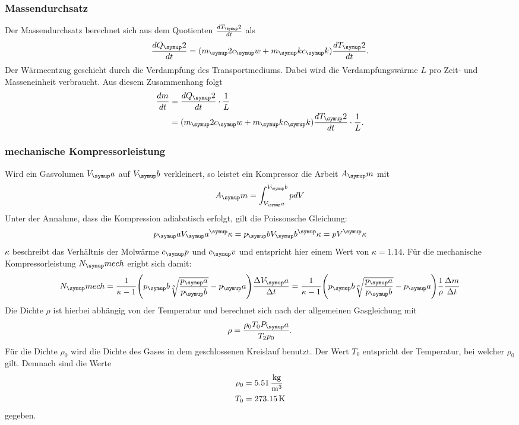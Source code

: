 \subsubsection{Massendurchsatz}
Der Massendurchsatz berechnet sich aus dem Quotienten $\frac{dT_\su{2}}{dt}$ als
\begin{equation}
  \frac{dQ_\su{2}}{dt}= (m_\su{2}c_\su{w}+m_\su{k}c_\su{k})\frac{dT_\su{2}}{dt}.
\end{equation}
Der Wärmeentzug geschieht durch die Verdampfung des Transportmediums. Dabei wird die
Verdampfungswärme $L$ pro Zeit- und Masseneinheit verbraucht. Aus diesem Zusammenhang folgt
\begin{align}
  \frac{dm}{dt} &= \frac{dQ_\su{2}}{dt} \cdot \frac{1}{L} \\
      &= (m_\su{2}c_\su{w}+m_\su{k}c_\su{k})\frac{dT_\su{2}}{dt} \cdot \frac{1}{L}.
      \label{eqn:dm/dt}
\end{align}
\subsubsection{mechanische Kompressorleistung}
Wird ein Gasvolumen $V_\su{a}$ auf $V_\su{b}$ verkleinert, so leistet ein Kompressor
die Arbeit $A_\su{m}$ mit
\begin{equation}
  A_\su{m} = \int_{V_\su{a}}^{V_\su{b}}pdV
\end{equation}
Unter der Annahme, dass die Kompression adiabatisch erfolgt, gilt die Poissonsche
Gleichung:
\begin{equation}
  p_\su{a}V_\su{a}^\su{\kappa} = p_\su{b}V_\su{b}^\su{\kappa} = pV^\su{\kappa}
\end{equation}
$\kappa$ beschreibt das Verhältnis der Molwärme $c_\su{p}$ und $c_\su{v}$ und entspricht hier
einem Wert von $\kappa = 1.14$.
Für die mechanische Kompressorleistung $N_\su{mech}$ erigbt sich damit:
\begin{equation}
  N_\su{mech}= \frac{1}{\kappa-1}\Biggl(p_\su{b}\sqrt[\kappa]{\frac{p_\su{a}}{p_\su{b}}}-p_\su{a}
  \Biggr)\frac{\Delta V_\su{a}}{\Delta t} = \frac{1}{\kappa-1}\Biggl(p_\su{b}\sqrt[\kappa]{\frac{p_\su{a}}{p_\su{b}}}-p_\su{a}
  \Biggr)\frac{1}{\rho}\frac{\Delta m}{\Delta t}
  \label{eqn:Nmech}
\end{equation}
Die Dichte $\rho$ ist hierbei abhängig von der Temperatur und berechnet sich
nach der allgemeinen Gasgleichung mit
\begin{equation}
  \rho=\frac{\rho_0 T_0 P_\su{a}}{T_2 p_0}\label{eqn:rho}.
\end{equation}
Für die Dichte $\rho_0$ wird die Dichte des Gases in dem geschlossenen Kreislauf
benutzt. Der Wert $T_0$ entspricht der Temperatur, bei welcher $\rho_0$ gilt.
Demnach sind die Werte
\begin{align*}
  \rho_0 &= 5.51 \,\si{\kilo\gram\per\cubic\meter} \\
  T_0 &= 273.15 \,\si{\kelvin}
\end{align*}
gegeben.
